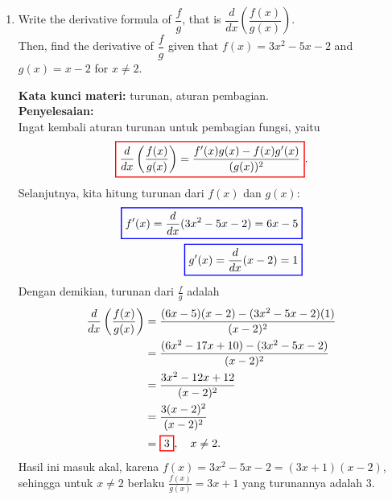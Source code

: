 \documentclass[10pt,openany,a4paper]{article}
\theoremstyle{definition}
\theoremstyle{definition}
\theoremstyle{plain}
\newenvironment{jawab}[2][tes]{%
\par\noindent\textbf{Kata kunci materi:} #1.\\
\textbf{Penyelesaian:} #2%
}{}
\begin{document}
\begin{enumerate}
    \item Write the derivative formula of $\dfrac{f}{g}$, that is $\dfrac{d}{dx}\left(\dfrac{f(x)}{g(x)}\right)$.\\
    Then, find the derivative of $\dfrac{f}{g}$ given that $f(x)=3x^2-5x-2$ and $g(x)=x-2$ for $x\neq 2$.
    \begin{jawab}[turunan, aturan pembagian]{~\\
        Ingat kembali aturan turunan untuk pembagian fungsi, yaitu
        \[
        \colorlet{oldcolor}{.}
        \color{red}
        \setlength{\fboxrule}{1pt} \boxed{\color{oldcolor}\frac{d}{dx}\left(\frac{f(x)}{g(x)}\right) = \frac{f'(x)g(x) - f(x)g'(x)}{(g(x))^2}}\color{oldcolor}.
        \]
        Selanjutnya, kita hitung turunan dari \(f(x)\) dan \(g(x)\):
        \begin{align*}
            \colorlet{oldcolor}{.}
        \color{blue}
        \setlength{\fboxrule}{1pt} \boxed{\color{oldcolor}f'(x) = \frac{d}{dx}(3x^2 - 5x - 2) = 6x - 5}\color{oldcolor}\\
            \colorlet{oldcolor}{.}
        \color{blue}
        \setlength{\fboxrule}{1pt} \boxed{\color{oldcolor}g'(x) = \frac{d}{dx}(x - 2) = 1}\color{oldcolor}
        \end{align*}
        Dengan demikian, turunan dari \(\frac{f}{g}\) adalah
        \begin{align*}
            \frac{d}{dx}\left(\frac{f(x)}{g(x)}\right) &= \frac{(6x - 5)(x - 2) - (3x^2 - 5x - 2)(1)}{(x - 2)^2}\\
            &= \frac{(6x^2 - 17x + 10) - (3x^2 - 5x - 2)}{(x - 2)^2}\\
            &= \frac{3x^2 - 12x + 12}{(x - 2)^2}\\
            &= \frac{3(x-2)^2}{(x - 2)^2}\\
            &= \colorlet{oldcolor}{.}
        \color{red}
        \setlength{\fboxrule}{1pt} \boxed{\color{oldcolor}3}\color{oldcolor}, \quad x\neq 2.
        \end{align*}
        Hasil ini masuk akal, karena $f(x)=3x^2-5x-2=(3x+1)(x-2)$, sehingga untuk $x\neq 2$ berlaku $\frac{f(x)}{g(x)}=3x+1$ yang turunannya adalah $3$.
    }
    \end{jawab}


\end{enumerate}
\end{document}
